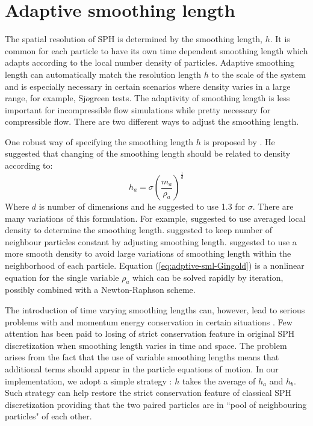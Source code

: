 \section{Adaptive smoothing length}
The spatial resolution of SPH is determined by the smoothing length, $h$. It is common for each particle to have its own time dependent smoothing length which adapts according to the local number density of particles. Adaptive smoothing length can automatically match the resolution length $h$ to the scale of the system and is especially necessary in certain scenarios where density varies in a large range, for example, Sj$\ddot{o}$green tests.
The adaptivity of smoothing length is less important for incompressible flow simulations while pretty necessary for compressible flow. There are two different ways to adjust the smoothing length.

One robust way of specifying the smoothing length $h$ is proposed by \citet{gingold1978binary}. He suggested that changing of the smoothing length should be related to density according to: 
\begin{equation}
h_a = \sigma \left(\frac{m_a}{\rho_a}\right)^{\frac{1}{d}}
\label{eq:adptive-sml-Gingold}
\end{equation}
Where $d$ is number of dimensions and he suggested to use 1.3 for $\sigma$.
There are many variations of this formulation. For example, \citet{steinmetz1993capabilities} suggested to use averaged local density to determine the smoothing length. \citet{hernquist1989treesph} suggested to keep number of neighbour particles constant by adjusting smoothing length. \citet{inutsuka2002reformulation} suggested to use a more smooth density to avoid large variations of smoothing length within the neighborhood of each particle.
Equation (\ref{eq:adptive-sml-Gingold}) is a nonlinear equation for the single variable $\rho_a$  which can be solved rapidly by iteration, possibly combined with a Newton-Raphson scheme.

The introduction of time varying smoothing lengths can, however, lead to serious problems with and momentum energy conservation in certain situations \citep{hernquist1993some}. Few attention has been paid to losing of strict conservation feature in original SPH discretization when smoothing length varies in time and space. The problem arises from the fact that the use of variable smoothing lengths means that additional terms \citep{nelson1994variable} should appear in the particle equations of motion. In our implementation, we adopt a simple strategy \citep{evrard1988beyond}: $h$ takes the average of $h_a$ and $h_b$. Such strategy can help restore the strict conservation feature of classical SPH discretization providing that the two paired particles are in ``pool of neighbouring particles" of each other. 

